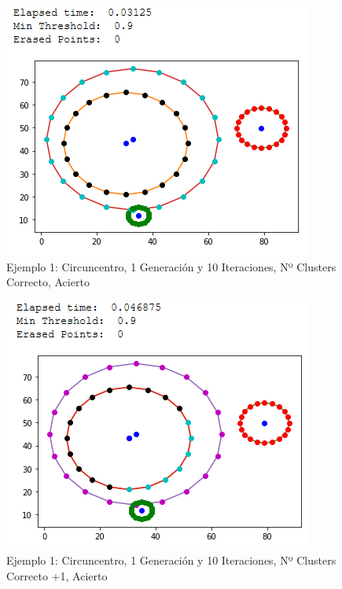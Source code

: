 \documentclass[conference,a4paper]{IEEEtran}
\begin{document}
\begin{figure}[H]
\centering
\includegraphics[scale=0.65]{Experimentacion/Ejemplo1/ej1_c_1_10_cc}
\caption{Ejemplo 1: Circuncentro, 1 Generación y 10 Iteraciones,  Nº Clusters Correcto, Acierto\\}
\end{figure}

\begin{figure}[H]
\centering
\includegraphics[scale=0.65]{Experimentacion/Ejemplo1/ej1_c_1_10_mc_correct}
\caption{Ejemplo 1: Circuncentro, 1 Generación y 10 Iteraciones,  Nº Clusters Correcto +1, Acierto\\}
\end{figure}
\end{document}
